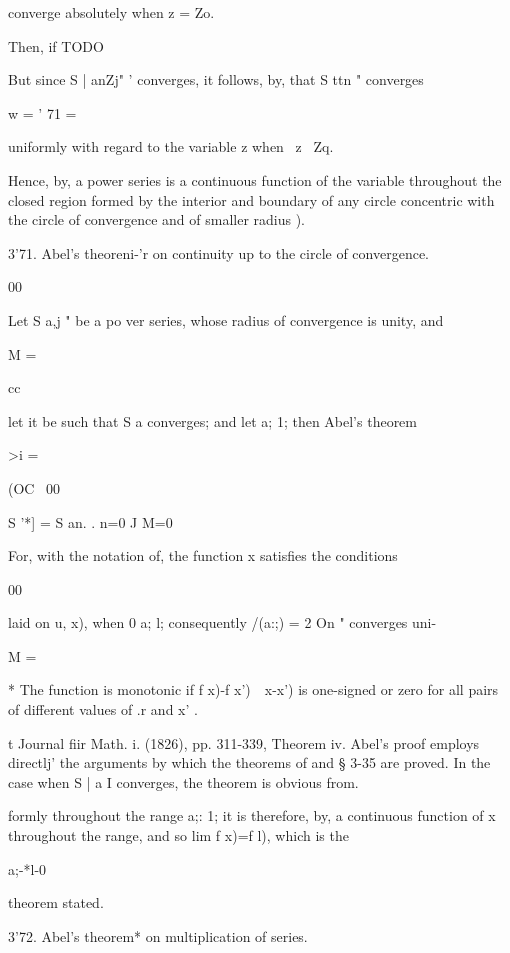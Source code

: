 converge absolutely when z = Zo.

Then, if
TODO

But since S | anZj" ' converges, it follows, by, that S ttn "
converges

w = ' 71 =

uniformly with regard to the variable z when \ z \ Zq.

Hence, by, a power series is a continuous function of the
variable throughout the closed region formed by the interior and
boundary of any circle concentric with the circle of convergence and
of smaller radius ).

  3'71. Abel's theoreni-'r on continuity up to the circle of
convergence.

00

Let S a,j " be a po ver series, whose radius of convergence is unity,
and

M =

cc

let it be such that S a converges; and let a; 1; then Abel's theorem

>i =

(OC \ 00

S '*] = S an. . n=0 J M=0

For, with the notation of, the function x satisfies the
conditions

00

laid on u, x), when 0 a; l; consequently /(a:;) = 2 On " converges
uni-

M =

* The function is monotonic if f x)-f x')\ \ x-x') is one-signed or
zero for all pairs of different values of .r and x' .

t Journal fiir Math. i. (1826), pp. 311-339, Theorem iv. Abel's proof
employs directlj' the arguments by which the theorems of and §
3-35 are proved. In the case when S | a I converges, the theorem is
obvious from.

%
%

formly throughout the range a;: 1; it is therefore, by, a
continuous function of x throughout the range, and so lim f x)=f l),
which is the

a;-*l-0

theorem stated.

3'72. Abel's theorem* on multiplication of series.

